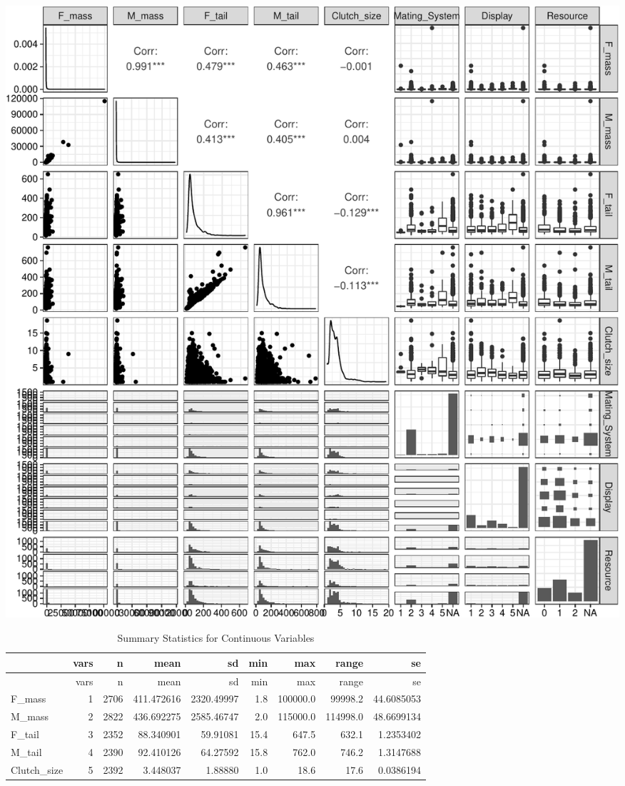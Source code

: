 \documentclass[
  12pt,
]{article}
\begin{document}
\includegraphics{Project_Code_files/figure-latex/gg exploration-1.pdf}

\newpage

\begin{longtable}[]{@{}lrrrrrrrr@{}}
\caption{Summary Statistics for Continuous Variables}\tabularnewline
\toprule
& vars & n & mean & sd & min & max & range & se \\
\midrule
\endfirsthead
\toprule
& vars & n & mean & sd & min & max & range & se \\
\midrule
\endhead
F\_mass & 1 & 2706 & 411.472616 & 2320.49997 & 1.8 & 100000.0 & 99998.2
& 44.6085053 \\
M\_mass & 2 & 2822 & 436.692275 & 2585.46747 & 2.0 & 115000.0 & 114998.0
& 48.6699134 \\
F\_tail & 3 & 2352 & 88.340901 & 59.91081 & 15.4 & 647.5 & 632.1 &
1.2353402 \\
M\_tail & 4 & 2390 & 92.410126 & 64.27592 & 15.8 & 762.0 & 746.2 &
1.3147688 \\
Clutch\_size & 5 & 2392 & 3.448037 & 1.88880 & 1.0 & 18.6 & 17.6 &
0.0386194 \\
\bottomrule
\end{longtable}
\end{document}

